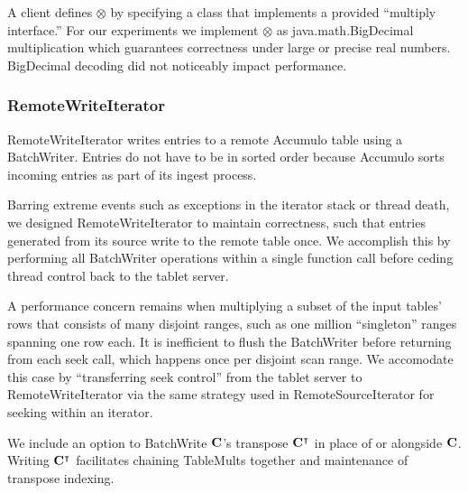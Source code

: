 A client defines $\otimes$ by specifying a class 
that implements a provided ``multiply interface.''
For our experiments we implement $\otimes$ as java.math.BigDecimal multiplication
which guarantees correctness under large or precise real numbers.
BigDecimal decoding did not noticeably impact performance.

\subsubsection{RemoteWriteIterator}
RemoteWriteIterator writes entries to a remote Accumulo table using a BatchWriter. %
Entries do not have to be in sorted order because Accumulo sorts incoming entries as part of its
 ingest process. 

Barring extreme events such as exceptions in the iterator stack or thread death,
we designed RemoteWriteIterator to maintain correctness, such that entries generated from
its source write to the remote table once.
We accomplish this by performing all BatchWriter operations within a single function call
before ceding thread control back to the tablet server.  

A performance concern remains when multiplying a subset of the input tables' rows 
that consists of many disjoint ranges, such as one million ``singleton'' ranges spanning one row each.
It is inefficient to flush the BatchWriter before returning from each seek call, which happens once per 
disjoint scan range. %
We accomodate this case by ``transferring seek control'' %
from the tablet server to RemoteWriteIterator 
via the same strategy used in RemoteSourceIterator for seeking within an iterator.

We include an option to BatchWrite $\mathbf{C}$'s transpose $\mathbf{C^{\intercal}}$ in place of or alongside $\mathbf{C}$. 
Writing $\mathbf{C^{\intercal}}$ facilitates chaining TableMults together
and maintenance of transpose indexing.

